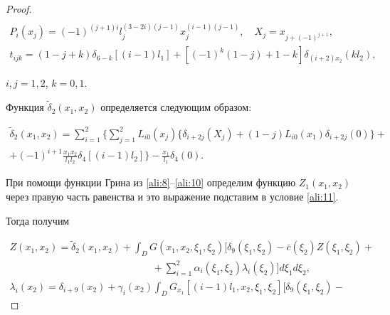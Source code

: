 \begin{proof}
\begin{gather*}
\\

P_i(x_j)=(-1)^{(j+1)i}l_j^{(3-2i)(j-1)}x_j^{(i-1)(j-1)}, \quad X_j=x_{j+(-1)^{j+1}},

\\

t_{ijk}=(1-j+k)\delta_{6-k}[(i-1)l_1]+[(-1)^k(1-j)+1-k]\delta_{(i+2)x_2}(kl_2), 

\end{gather*}

$i,j = 1, 2$, $k = 0, 1$.



Функция $\tilde{\delta}_2(x_1,x_2)$ определяется следующим образом:

\begin{multline*}

\tilde{\delta}_2(x_1,x_2)=\sum\limits_{i=1}^2\biggl\{\sum\limits_{j=1}^2L_{i0}(x_j)\bigl\{\delta_{i+2j}(X_j)+(1-j)L_{i0}(x_1)\delta_{i+2j}(0)\bigr\}+

\\

+(-1)^{i+1}\frac{x_1x_2}{l_1l_2}\delta_4[(i-1)l_2]\biggr\}-\frac{x_1}{l_1}\delta_4(0).

\end{multline*}

При помощи функции Грина \cite{ali:bib:25} из \eqref{ali:8}--\eqref{ali:10} определим функцию $Z_1(x_1,x_2)$ через правую часть равенства и это выражение подставим в условие \eqref{ali:11}. 

Тогда получим

\begin{equation}

\begin{array}{l}

\displaystyle

Z(x_1,x_2)=\tilde{\delta}_2(x_1,x_2)+\int_D G(x_1,x_2,\xi_1,\xi_2)\biggl[\delta_9(\xi_1,\xi_2)-\bar{c}(\xi_2)Z(\xi_1,\xi_2)+

\\

\displaystyle \hspace{6cm}

+\sum\limits_{i=1}^2 \alpha_i(\xi_1,\xi_2)\lambda_i(\xi_2)\biggr]d\xi_1d\xi_2,

\\

\displaystyle

\lambda_i(x_2)=\delta_{i+9}(x_2)+\gamma_i(x_2)\int_D G_{x_1}[(i-1)l_1,x_2,\xi_1,\xi_2]\biggl[\delta_9(\xi_1,\xi_2)-


\end{array}
\end{equation}
\end{proof}
